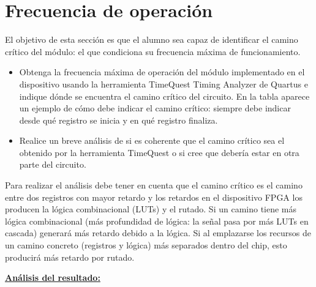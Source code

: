 \documentclass[parskip,a4paper,12pt]{article}
\newcommand{\fila}{}
\begin{document}
\section{Frecuencia de operación}
\begin{enunciado}{}{}

El objetivo de esta sección es que el alumno sea capaz de identificar  el camino crítico del módulo: el que condiciona su frecuencia máxima de funcionamiento.  
\begin{itemize}
    \item Obtenga la frecuencia máxima de operación del módulo implementado en el dispositivo usando la herramienta TimeQuest Timing Analyzer de Quartus e indique dónde se encuentra el camino crítico del circuito. En la tabla aparece un ejemplo de cómo debe indicar el camino crítico: siempre debe indicar desde qué registro se inicia y en qué registro finaliza.
    \item Realice un breve análisis de si es coherente que el camino crítico sea el obtenido por la herramienta TimeQuest o si cree que debería estar en otra parte del circuito.
\end{itemize}

Para realizar el análisis debe tener en cuenta que el camino crítico es el camino entre dos registros con mayor retardo y los retardos en el dispositivo FPGA los producen la lógica combinacional (LUTs) y el rutado. Si un camino tiene más lógica combinacional (más profundidad de lógica: la señal pasa por más LUTs en cascada) generará más retardo debido a la lógica. Si al emplazarse los recursos de un camino concreto (registros y lógica) más separados dentro del chip, esto producirá más retardo por rutado.  

\end{enunciado}


\def\colUNO{3cm}
\def\colDOS{12cm}

\begin{table}[H]
    \caption{Frecuencia de reloj y camino crítico}
    \label{tab:frec_clk}
\gdef\cabecera{\fila{$f_{clk} $ (MHz)}{CAMINO CRÍTICO}}
\noindent\begin{mitabla}
\fila{}{} 
\end{mitabla}
\end{table}


\underline{\textbf{Análisis del resultado:}}
\end{document}
